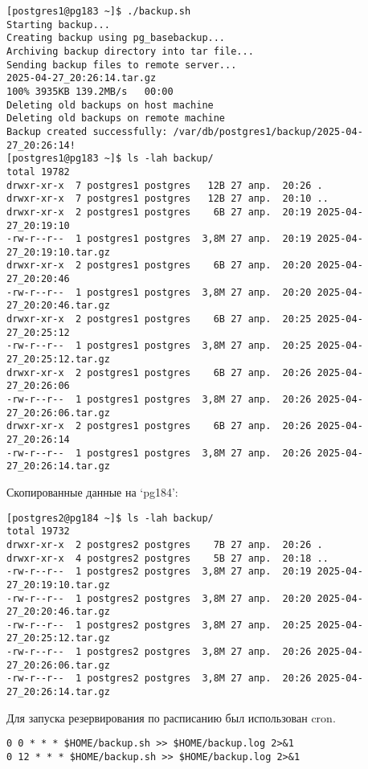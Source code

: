 \begin{verbatim}
[postgres1@pg183 ~]$ ./backup.sh
Starting backup...
Creating backup using pg_basebackup...
Archiving backup directory into tar file...
Sending backup files to remote server...
2025-04-27_20:26:14.tar.gz                                                                                                                             100% 3935KB 139.2MB/s   00:00
Deleting old backups on host machine
Deleting old backups on remote machine
Backup created successfully: /var/db/postgres1/backup/2025-04-27_20:26:14!
[postgres1@pg183 ~]$ ls -lah backup/
total 19782
drwxr-xr-x  7 postgres1 postgres   12B 27 апр.  20:26 .
drwxr-xr-x  7 postgres1 postgres   12B 27 апр.  20:10 ..
drwxr-xr-x  2 postgres1 postgres    6B 27 апр.  20:19 2025-04-27_20:19:10
-rw-r--r--  1 postgres1 postgres  3,8M 27 апр.  20:19 2025-04-27_20:19:10.tar.gz
drwxr-xr-x  2 postgres1 postgres    6B 27 апр.  20:20 2025-04-27_20:20:46
-rw-r--r--  1 postgres1 postgres  3,8M 27 апр.  20:20 2025-04-27_20:20:46.tar.gz
drwxr-xr-x  2 postgres1 postgres    6B 27 апр.  20:25 2025-04-27_20:25:12
-rw-r--r--  1 postgres1 postgres  3,8M 27 апр.  20:25 2025-04-27_20:25:12.tar.gz
drwxr-xr-x  2 postgres1 postgres    6B 27 апр.  20:26 2025-04-27_20:26:06
-rw-r--r--  1 postgres1 postgres  3,8M 27 апр.  20:26 2025-04-27_20:26:06.tar.gz
drwxr-xr-x  2 postgres1 postgres    6B 27 апр.  20:26 2025-04-27_20:26:14
-rw-r--r--  1 postgres1 postgres  3,8M 27 апр.  20:26 2025-04-27_20:26:14.tar.gz
\end{verbatim}

Скопированные данные на `pg184':

\begin{verbatim}
[postgres2@pg184 ~]$ ls -lah backup/
total 19732
drwxr-xr-x  2 postgres2 postgres    7B 27 апр.  20:26 .
drwxr-xr-x  4 postgres2 postgres    5B 27 апр.  20:18 ..
-rw-r--r--  1 postgres2 postgres  3,8M 27 апр.  20:19 2025-04-27_20:19:10.tar.gz
-rw-r--r--  1 postgres2 postgres  3,8M 27 апр.  20:20 2025-04-27_20:20:46.tar.gz
-rw-r--r--  1 postgres2 postgres  3,8M 27 апр.  20:25 2025-04-27_20:25:12.tar.gz
-rw-r--r--  1 postgres2 postgres  3,8M 27 апр.  20:26 2025-04-27_20:26:06.tar.gz
-rw-r--r--  1 postgres2 postgres  3,8M 27 апр.  20:26 2025-04-27_20:26:14.tar.gz
\end{verbatim}

Для запуска резервирования по расписанию был использован cron.

\begin{verbatim}
0 0 * * * $HOME/backup.sh >> $HOME/backup.log 2>&1
0 12 * * * $HOME/backup.sh >> $HOME/backup.log 2>&1
\end{verbatim}

